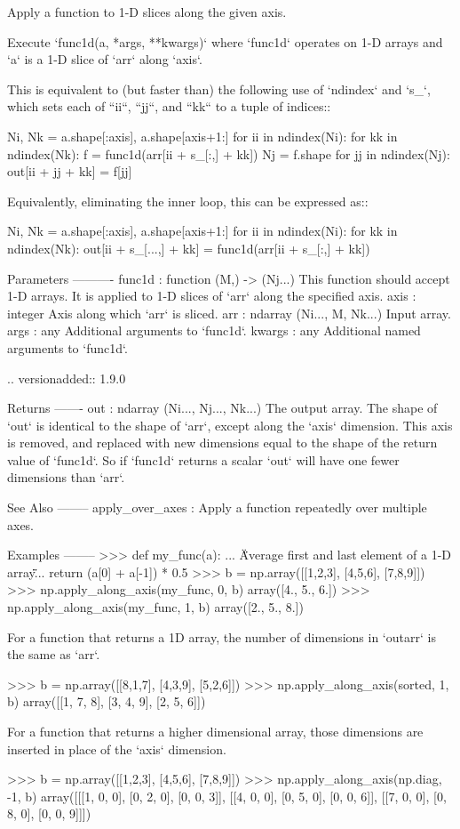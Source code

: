 \begin{DoxyVerb}Apply a function to 1-D slices along the given axis.

Execute `func1d(a, *args, **kwargs)` where `func1d` operates on 1-D arrays
and `a` is a 1-D slice of `arr` along `axis`.

This is equivalent to (but faster than) the following use of `ndindex` and
`s_`, which sets each of ``ii``, ``jj``, and ``kk`` to a tuple of indices::

    Ni, Nk = a.shape[:axis], a.shape[axis+1:]
    for ii in ndindex(Ni):
        for kk in ndindex(Nk):
            f = func1d(arr[ii + s_[:,] + kk])
            Nj = f.shape
            for jj in ndindex(Nj):
                out[ii + jj + kk] = f[jj]

Equivalently, eliminating the inner loop, this can be expressed as::

    Ni, Nk = a.shape[:axis], a.shape[axis+1:]
    for ii in ndindex(Ni):
        for kk in ndindex(Nk):
            out[ii + s_[...,] + kk] = func1d(arr[ii + s_[:,] + kk])

Parameters
----------
func1d : function (M,) -> (Nj...)
    This function should accept 1-D arrays. It is applied to 1-D
    slices of `arr` along the specified axis.
axis : integer
    Axis along which `arr` is sliced.
arr : ndarray (Ni..., M, Nk...)
    Input array.
args : any
    Additional arguments to `func1d`.
kwargs : any
    Additional named arguments to `func1d`.

    .. versionadded:: 1.9.0


Returns
-------
out : ndarray  (Ni..., Nj..., Nk...)
    The output array. The shape of `out` is identical to the shape of
    `arr`, except along the `axis` dimension. This axis is removed, and
    replaced with new dimensions equal to the shape of the return value
    of `func1d`. So if `func1d` returns a scalar `out` will have one
    fewer dimensions than `arr`.

See Also
--------
apply_over_axes : Apply a function repeatedly over multiple axes.

Examples
--------
>>> def my_func(a):
...     \"\"\"Average first and last element of a 1-D array\"\"\"
...     return (a[0] + a[-1]) * 0.5
>>> b = np.array([[1,2,3], [4,5,6], [7,8,9]])
>>> np.apply_along_axis(my_func, 0, b)
array([4., 5., 6.])
>>> np.apply_along_axis(my_func, 1, b)
array([2.,  5.,  8.])

For a function that returns a 1D array, the number of dimensions in
`outarr` is the same as `arr`.

>>> b = np.array([[8,1,7], [4,3,9], [5,2,6]])
>>> np.apply_along_axis(sorted, 1, b)
array([[1, 7, 8],
       [3, 4, 9],
       [2, 5, 6]])

For a function that returns a higher dimensional array, those dimensions
are inserted in place of the `axis` dimension.

>>> b = np.array([[1,2,3], [4,5,6], [7,8,9]])
>>> np.apply_along_axis(np.diag, -1, b)
array([[[1, 0, 0],
        [0, 2, 0],
        [0, 0, 3]],
       [[4, 0, 0],
        [0, 5, 0],
        [0, 0, 6]],
       [[7, 0, 0],
        [0, 8, 0],
        [0, 0, 9]]])
\end{DoxyVerb}
